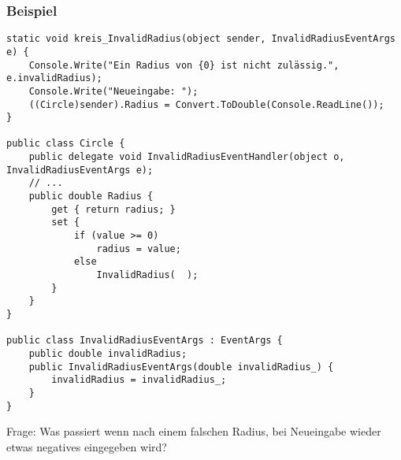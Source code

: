 \subsubsection*{Beispiel}
\begin{lstlisting}[language={[Sharp]C}]
static void kreis_InvalidRadius(object sender, InvalidRadiusEventArgs e) {
	Console.Write("Ein Radius von {0} ist nicht zulässig.", e.invalidRadius);
	Console.Write("Neueingabe: ");
	((Circle)sender).Radius = Convert.ToDouble(Console.ReadLine());
}

public class Circle {
	public delegate void InvalidRadiusEventHandler(object o, InvalidRadiusEventArgs e);
	// ...
	public double Radius {
		get { return radius; }
		set {
			if (value >= 0)
				radius = value;
			else 
				InvalidRadius(  );
		}
	}
}

public class InvalidRadiusEventArgs : EventArgs {
	public double invalidRadius;
	public InvalidRadiusEventArgs(double invalidRadius_) {
		invalidRadius = invalidRadius_;
	}
}
\end{lstlisting}

Frage: Was passiert wenn nach einem falschen Radius, bei Neueingabe wieder etwas negatives eingegeben wird?


